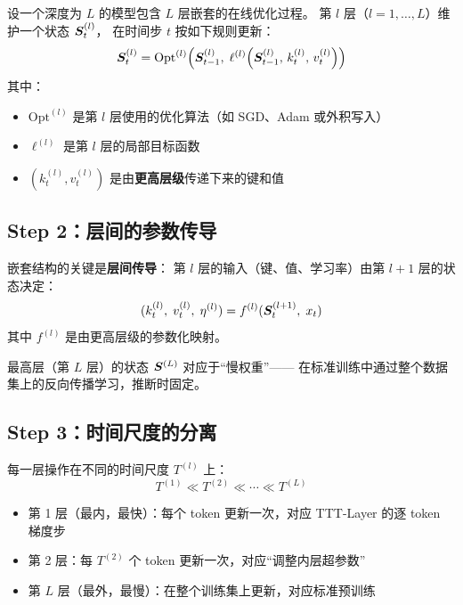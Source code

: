 \begin{definition}
\label{def:nested}
设一个深度为 $L$ 的模型包含 $L$ 层嵌套的在线优化过程。
第 $l$ 层（$l = 1, \ldots, L$）维护一个状态 $\boldsymbol{S}_t^{(l)}$，
在时间步 $t$ 按如下规则更新：
\begin{equation}
  \boldsymbol{S}_t^{(l)} = \mathrm{Opt}^{(l)}\!\left(
    \boldsymbol{S}_{t-1}^{(l)},\;
    \ell^{(l)}\!\left(\boldsymbol{S}_{t-1}^{(l)},\, k_t^{(l)},\, v_t^{(l)}\right)
  \right)
  \label{eq:nested_update}
\end{equation}
其中：
\begin{itemize}
  \item $\mathrm{Opt}^{(l)}$ 是第 $l$ 层使用的优化算法（如 SGD、Adam 或外积写入）
  \item $\ell^{(l)}$ 是第 $l$ 层的局部目标函数
  \item $(k_t^{(l)}, v_t^{(l)})$ 是由\textbf{更高层级}传递下来的键和值
\end{itemize}
\end{definition}

\subsection*{Step 2：层间的参数传导}

嵌套结构的关键是\textbf{层间传导}：
第 $l$ 层的输入（键、值、学习率）由第 $l+1$ 层的状态决定：
\begin{equation}
  (k_t^{(l)},\; v_t^{(l)},\; \eta^{(l)})
  = f^{(l)}(\boldsymbol{S}_t^{(l+1)},\; x_t)
  \label{eq:nested_propagation}
\end{equation}
其中 $f^{(l)}$ 是由更高层级的参数化映射。

最高层（第 $L$ 层）的状态 $\boldsymbol{S}^{(L)}$ 对应于``慢权重''——
在标准训练中通过整个数据集上的反向传播学习，推断时固定。

\subsection*{Step 3：时间尺度的分离}

每一层操作在不同的时间尺度 $T^{(l)}$ 上：
\begin{equation}
  T^{(1)} \ll T^{(2)} \ll \cdots \ll T^{(L)}
  \label{eq:nested_timescales}
\end{equation}

\begin{itemize}
  \item 第 1 层（最内，最快）：每个 token 更新一次，对应 TTT-Layer 的逐 token 梯度步
  \item 第 2 层：每 $T^{(2)}$ 个 token 更新一次，对应``调整内层超参数''
  \item 第 $L$ 层（最外，最慢）：在整个训练集上更新，对应标准预训练
\end{itemize}

